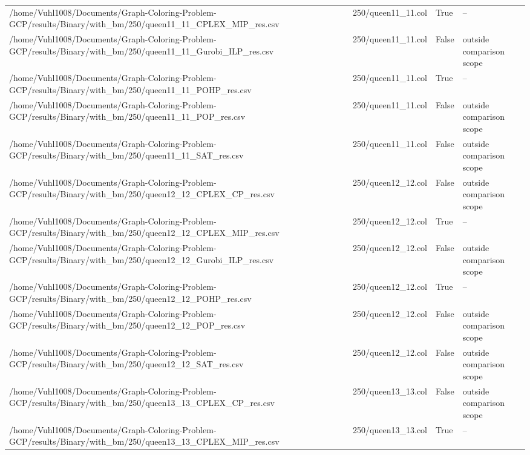 \begin{table}[htbp]
\begin{tabular}{llll}
/home/Vuhl1008/Documents/Graph-Coloring-Problem-GCP/results/Binary/with\_bm/250/queen11\_11\_CPLEX\_MIP\_res.csv & 250/queen11\_11.col & True & -- \\
/home/Vuhl1008/Documents/Graph-Coloring-Problem-GCP/results/Binary/with\_bm/250/queen11\_11\_Gurobi\_ILP\_res.csv & 250/queen11\_11.col & False & outside comparison scope \\
/home/Vuhl1008/Documents/Graph-Coloring-Problem-GCP/results/Binary/with\_bm/250/queen11\_11\_POHP\_res.csv & 250/queen11\_11.col & True & -- \\
/home/Vuhl1008/Documents/Graph-Coloring-Problem-GCP/results/Binary/with\_bm/250/queen11\_11\_POP\_res.csv & 250/queen11\_11.col & False & outside comparison scope \\
/home/Vuhl1008/Documents/Graph-Coloring-Problem-GCP/results/Binary/with\_bm/250/queen11\_11\_SAT\_res.csv & 250/queen11\_11.col & False & outside comparison scope \\
/home/Vuhl1008/Documents/Graph-Coloring-Problem-GCP/results/Binary/with\_bm/250/queen12\_12\_CPLEX\_CP\_res.csv & 250/queen12\_12.col & False & outside comparison scope \\
/home/Vuhl1008/Documents/Graph-Coloring-Problem-GCP/results/Binary/with\_bm/250/queen12\_12\_CPLEX\_MIP\_res.csv & 250/queen12\_12.col & True & -- \\
/home/Vuhl1008/Documents/Graph-Coloring-Problem-GCP/results/Binary/with\_bm/250/queen12\_12\_Gurobi\_ILP\_res.csv & 250/queen12\_12.col & False & outside comparison scope \\
/home/Vuhl1008/Documents/Graph-Coloring-Problem-GCP/results/Binary/with\_bm/250/queen12\_12\_POHP\_res.csv & 250/queen12\_12.col & True & -- \\
/home/Vuhl1008/Documents/Graph-Coloring-Problem-GCP/results/Binary/with\_bm/250/queen12\_12\_POP\_res.csv & 250/queen12\_12.col & False & outside comparison scope \\
/home/Vuhl1008/Documents/Graph-Coloring-Problem-GCP/results/Binary/with\_bm/250/queen12\_12\_SAT\_res.csv & 250/queen12\_12.col & False & outside comparison scope \\
/home/Vuhl1008/Documents/Graph-Coloring-Problem-GCP/results/Binary/with\_bm/250/queen13\_13\_CPLEX\_CP\_res.csv & 250/queen13\_13.col & False & outside comparison scope \\
/home/Vuhl1008/Documents/Graph-Coloring-Problem-GCP/results/Binary/with\_bm/250/queen13\_13\_CPLEX\_MIP\_res.csv & 250/queen13\_13.col & True & -- \\

\end{tabular}
\end{table}
